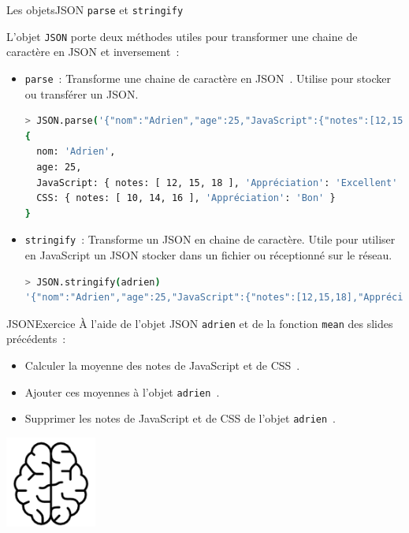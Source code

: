 \documentclass{beamer}
\begin{document}
    \begin{frame}[fragile]{Les objets}{JSON \lstinline{parse} et \lstinline{stringify}}
        \begin{footnotesize}
            L'objet \lstinline{JSON} porte deux méthodes utiles pour transformer une chaine de caractère en JSON et inversement~:
            \begin{itemize}
                \item \lstinline{parse}~: Transforme une chaine de caractère en JSON~.
                Utilise pour stocker ou transférer un JSON.
                \begin{lstlisting}[language=Bash,title={\scriptsize{Node.js}},basicstyle=\tiny\ttfamily]
> JSON.parse('{"nom":"Adrien","age":25,"JavaScript":{"notes":[12,15,18],"Appréciation":"Excellent"},"CSS":{"notes":[10,14,16],"Appréciation":"Bon"}}')
{
  nom: 'Adrien',
  age: 25,
  JavaScript: { notes: [ 12, 15, 18 ], 'Appréciation': 'Excellent' },
  CSS: { notes: [ 10, 14, 16 ], 'Appréciation': 'Bon' }
}
                \end{lstlisting}
                \item \lstinline{stringify}~: Transforme un JSON en chaine de caractère.
                Utile pour utiliser en JavaScript un JSON stocker dans un fichier ou réceptionné sur le réseau.
                \begin{lstlisting}[language=Bash,title={\scriptsize{Node.js}},basicstyle=\tiny\ttfamily]
> JSON.stringify(adrien)
'{"nom":"Adrien","age":25,"JavaScript":{"notes":[12,15,18],"Appréciation":"Excellent"},"CSS":{"notes":[10,14,16],"Appréciation":"Bon"}}'
                \end{lstlisting}
            \end{itemize}
        \end{footnotesize}
    \end{frame}

    \begin{frame}{JSON}{Exercice \execcounterdispinc{}}
        À l'aide de l'objet JSON \lstinline{adrien} et de la fonction \lstinline{mean} des slides précédents~:
        \begin{itemize}
            \item Calculer la moyenne des notes de JavaScript et de CSS~.
            \item Ajouter ces moyennes à l'objet \lstinline{adrien}~.
            \item Supprimer les notes de JavaScript et de CSS de l'objet \lstinline{adrien}~.
        \end{itemize}
        \bigbreak
        \centering
        \includegraphics[width=3cm]{image/intelligence}
    \end{frame}
\end{document}
